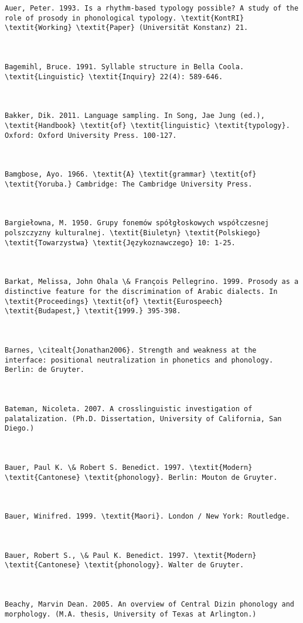 \begin{verbatim}
Auer, Peter. 1993. Is a rhythm-based typology possible? A study of the role of prosody in phonological typology. \textit{KontRI} \textit{Working} \textit{Paper} (Universität Konstanz) 21.



Bagemihl, Bruce. 1991. Syllable structure in Bella Coola. \textit{Linguistic} \textit{Inquiry} 22(4): 589-646.



Bakker, Dik. 2011. Language sampling. In Song, Jae Jung (ed.), \textit{Handbook} \textit{of} \textit{linguistic} \textit{typology}. Oxford: Oxford University Press. 100-127.



Bamgbose, Ayo. 1966. \textit{A} \textit{grammar} \textit{of} \textit{Yoruba.} Cambridge: The Cambridge University Press.



Bargiełowna, M. 1950. Grupy fonemów spółgłoskowych współczesnej polszczyzny kulturalnej. \textit{Biuletyn} \textit{Polskiego} \textit{Towarzystwa} \textit{Językoznawczego} 10: 1-25.



Barkat, Melissa, John Ohala \& François Pellegrino. 1999. Prosody as a distinctive feature for the discrimination of Arabic dialects. In \textit{Proceedings} \textit{of} \textit{Eurospeech} \textit{Budapest,} \textit{1999.} 395-398.



Barnes, \citealt{Jonathan2006}. Strength and weakness at the interface: positional neutralization in phonetics and phonology. Berlin: de Gruyter.



Bateman, Nicoleta. 2007. A crosslinguistic investigation of palatalization. (Ph.D. Dissertation, University of California, San Diego.)



Bauer, Paul K. \& Robert S. Benedict. 1997. \textit{Modern} \textit{Cantonese} \textit{phonology}. Berlin: Mouton de Gruyter.



Bauer, Winifred. 1999. \textit{Maori}. London / New York: Routledge.



Bauer, Robert S., \& Paul K. Benedict. 1997. \textit{Modern} \textit{Cantonese} \textit{phonology}. Walter de Gruyter.



Beachy, Marvin Dean. 2005. An overview of Central Dizin phonology and morphology. (M.A. thesis, University of Texas at Arlington.)




\end{verbatim}

